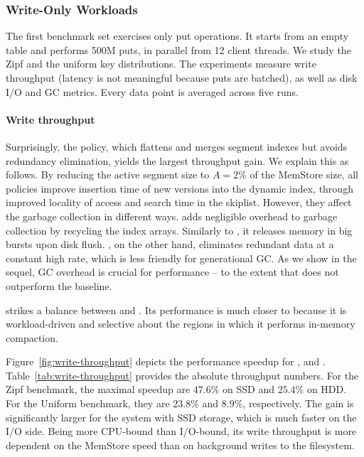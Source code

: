\subsubsection{Write-Only Workloads}

The first benchmark set exercises only put operations. It starts from an empty table and performs 500M puts, 
in parallel from 12 client threads. We study the Zipf and the uniform key distributions. The experiments measure
write throughput (latency is not meaningful because puts are batched), as well as disk I/O and GC metrics. 
Every data point is averaged across five runs. 

\paragraph{Write throughput} Surprisingly, the \basic\/ policy, which flattens and merges segment indexes but avoids 
redundancy elimination, yields the largest throughput gain. We explain this as follows. By reducing the active 
segment size to $A=2$\% of the MemStore size, all \sys\/ policies improve insertion time of new versions 
into the dynamic index, through improved locality of access and search time in the skiplist. However, 
they affect the garbage collection in different ways. \basic\/ adds negligible overhead to 
garbage collection by recycling the index arrays. Similarly to \none, it releases memory in big bursts
upon disk flush. \eager, on the other hand, eliminates redundant data at a constant high rate,
which is less friendly for generational GC. As we show in the sequel, GC overhead is crucial for 
performance -- to the extent that \eager\/ does not outperform the baseline. 

\adp\/ strikes a balance between \basic\/ and \eager. Its performance is much closer to \basic\/ 
because it is workload-driven and selective about the regions in which it performs in-memory compaction.  

Figure~\ref{fig:write-throughput} depicts the performance speedup for
\none, \basic\/ and \adp. Table~\ref{tab:write-throughput} provides the absolute throughput numbers. 
For the Zipf benchmark, the maximal speedup are $47.6\%$ on SSD and $25.4\%$ on HDD. For the Uniform benchmark, 
they are $23.8\%$ and $8.9\%$, respectively. The gain is significantly larger for the system with SSD storage, 
which is much faster on the I/O side. Being more CPU-bound than I/O-bound, its write throughput is more dependent on 
the MemStore speed than on background writes to the filesystem. 

